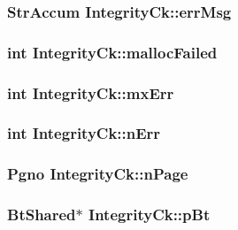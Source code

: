 \subsubsection{\setlength{\rightskip}{0pt plus 5cm}\bf{Str\-Accum} \bf{Integrity\-Ck::err\-Msg}}\label{structIntegrityCk_d7f72f622682c89d8ceef8a6e9e8bb70}


\subsubsection{\setlength{\rightskip}{0pt plus 5cm}int \bf{Integrity\-Ck::malloc\-Failed}}\label{structIntegrityCk_8e8f16095ca604c12f8b33fa90bab3f1}


\subsubsection{\setlength{\rightskip}{0pt plus 5cm}int \bf{Integrity\-Ck::mx\-Err}}\label{structIntegrityCk_f2810dcb996159ca2bae86859a6f620f}


\subsubsection{\setlength{\rightskip}{0pt plus 5cm}int \bf{Integrity\-Ck::n\-Err}}\label{structIntegrityCk_7144be3493f8d8878dc52eb6267207d3}


\subsubsection{\setlength{\rightskip}{0pt plus 5cm}\bf{Pgno} \bf{Integrity\-Ck::n\-Page}}\label{structIntegrityCk_1217fd4586eba617c625a61206b1c5ac}


\subsubsection{\setlength{\rightskip}{0pt plus 5cm}\bf{Bt\-Shared}$\ast$ \bf{Integrity\-Ck::p\-Bt}}\label{structIntegrityCk_fbc0d636410b59acb5d94b5734cb53db}


